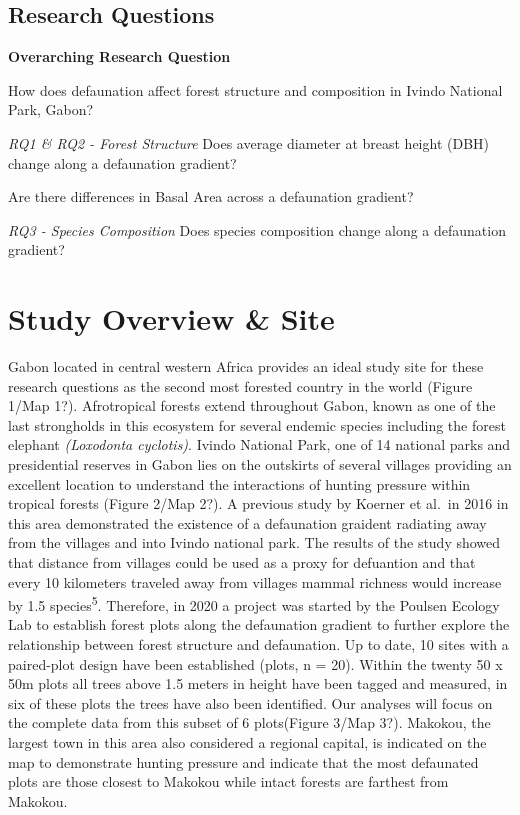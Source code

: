 \documentclass[
  12pt,
]{article}
\begin{document}
\hypertarget{research-questions}{%
\subsection{\texorpdfstring{\textbf{Research
Questions}}{Research Questions}}\label{research-questions}}

\textbf{Overarching Research Question}

How does defaunation affect forest structure and composition in Ivindo
National Park, Gabon?

\emph{RQ1 \& RQ2 - Forest Structure} Does average diameter at breast
height (DBH) change along a defaunation gradient?

Are there differences in Basal Area across a defaunation gradient?

\emph{RQ3 - Species Composition} Does species composition change along a
defaunation gradient?

\hypertarget{study-overview-site}{%
\section{Study Overview \& Site}\label{study-overview-site}}

Gabon located in central western Africa provides an ideal study site for
these research questions as the second most forested country in the
world (Figure 1/Map 1?). Afrotropical forests extend throughout Gabon,
known as one of the last strongholds in this ecosystem for several
endemic species including the forest elephant \emph{(Loxodonta
cyclotis)}. Ivindo National Park, one of 14 national parks and
presidential reserves in Gabon lies on the outskirts of several villages
providing an excellent location to understand the interactions of
hunting pressure within tropical forests (Figure 2/Map 2?). A previous
study by Koerner et al.~in 2016 in this area demonstrated the existence
of a defaunation graident radiating away from the villages and into
Ivindo national park. The results of the study showed that distance from
villages could be used as a proxy for defuantion and that every 10
kilometers traveled away from villages mammal richness would increase by
1.5 species\textsuperscript{5}. Therefore, in 2020 a project was started
by the Poulsen Ecology Lab to establish forest plots along the
defaunation gradient to further explore the relationship between forest
structure and defaunation. Up to date, 10 sites with a paired-plot
design have been established (plots, n = 20). Within the twenty 50 x 50m
plots all trees above 1.5 meters in height have been tagged and
measured, in six of these plots the trees have also been identified. Our
analyses will focus on the complete data from this subset of 6
plots(Figure 3/Map 3?). Makokou, the largest town in this area also
considered a regional capital, is indicated on the map to demonstrate
hunting pressure and indicate that the most defaunated plots are those
closest to Makokou while intact forests are farthest from Makokou.
\end{document}
